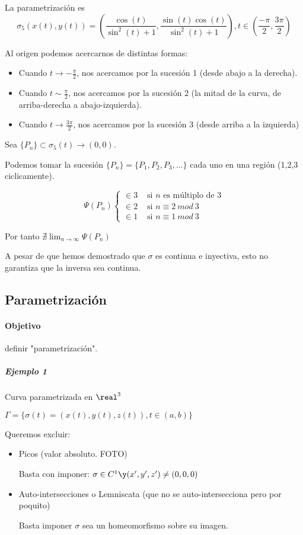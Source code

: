 La parametrización es \[\sigma_5 (x(t),y(t)) = \left(\frac{\cos(t)}{\sin^2(t)+1},\frac{\sin(t)\cos(t)}{\sin^2(t)+1}\right), t\in \left(\frac{-\pi}{2},\frac{3\pi}{2}\right)\]

Al origen podemos acercarnos de distintas formas:

\begin{itemize}
\item Cuando $t \to - \frac{\pi}{2}$, nos acercamos por la sucesión 1 (desde abajo a la derecha).
\item Cuando $t \sim \frac{\pi}{2}$, nos acercamos por la sucesión 2 (la mitad de la curva, de arriba-derecha a abajo-izquierda).
\item Cuando $t \to \frac{3\pi}{2}$, nos acercamos por la sucesión 3 (desde arriba a la izquierda)
\end{itemize}

Sea $\{P_n\}\subset \sigma_5(t) \rightarrow (0,0)$.

Podemos tomar la sucesión $\{P_n\} = \{P_1,P_2,P_3,...\}$ cada uno en una región (1,2,3 ciclicamente).

\[\Psi(P_n) \begin{cases}
\in 3 & \text{ si }n \text{ es múltiplo de }3\\
\in 2 & \text{ si } n\equiv 2\ mod \ 3\\
\in 1 & \text{ si } n \equiv 1\ mod \ 3
\end{cases}\]

Por tanto $\nexists \displaystyle \lim_{n\rightarrow \infty} \Psi(P_n)$

\begin{remark} A pesar de que hemos demostrado que $\sigma$ es continua e inyectiva, esto no garantiza que la inversa sea continua.\end{remark}

\subsection{Parametrización}

\paragraph{Objetivo} definir "parametrización".

\subparagraph{Ejemplo 1} Curva parametrizada en $\real^3$

$\Gamma = \{\sigma(t) = (x(t),y(t),z(t)), t \in (a,b)\}$

Queremos excluir:
\begin{itemize}
\item Picos (valor absoluto. FOTO) 

Basta con imponer: $\sigma \in C^1 \y (x',y',z') \neq (0,0,0)$

\item Auto-intersecciones o Lemniscata (que no se auto-intersecciona pero por poquito) 

Basta imponer $\sigma$ sea un homeomorfismo sobre su imagen.

\end{itemize}

